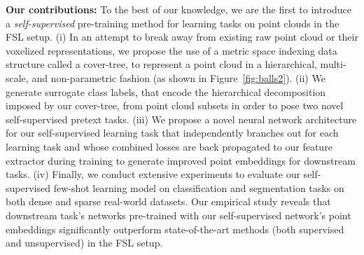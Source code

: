 \documentclass{article}
\begin{document}
\textbf{Our contributions:} 
To the best of our knowledge, we are the first to introduce a \emph{self-supervised} pre-training method for learning tasks on point clouds in the FSL setup.
(i) In an attempt to break away from existing raw point cloud or their voxelized representations, we propose the use of a metric space indexing data structure called a cover-tree, to represent a point cloud in a hierarchical, multi-scale, and non-parametric fashion (as shown in Figure~\ref{fig:balls2}).
(ii) We generate surrogate class labels, that encode the hierarchical decomposition imposed by our cover-tree, from point cloud subsets in order to pose two novel self-supervised pretext tasks.
(iii) We propose a novel neural network architecture for our self-supervised learning task that independently branches out for each learning task and whose combined losses are back propagated to our feature extractor during training to generate improved point embeddings for downstream tasks.  
(iv) Finally, we conduct extensive experiments to evaluate our self-supervised few-shot learning model on classification and segmentation tasks on both dense and sparse real-world datasets. 
Our empirical study reveals that downstream task's networks pre-trained with our self-supervised network's point embeddings significantly outperform state-of-the-art methods (both supervised and unsupervised) in the FSL setup.


   










\end{document}
